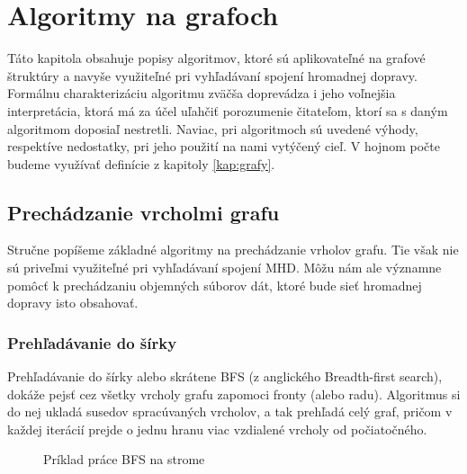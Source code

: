 \chapter{Algoritmy na grafoch}
\label{kap:algoritmy}

Táto kapitola obsahuje popisy algoritmov, ktoré sú aplikovateľné na grafové štruktúry a navyše využiteľné pri vyhľadávaní spojení hromadnej dopravy. Formálnu charakterizáciu algoritmu zväčša doprevádza i jeho voľnejšia interpretácia, ktorá má za účel uľahčiť porozumenie čitateľom, ktorí sa s daným algoritmom doposiaľ nestretli. Naviac, pri algoritmoch sú uvedené výhody, respektíve nedostatky, pri jeho použití na nami vytýčený cieľ. V hojnom počte budeme využívať definície z kapitoly \ref{kap:grafy}.\newline


\section{Prechádzanie vrcholmi grafu}

Stručne popíšeme základné algoritmy na prechádzanie vrholov grafu. Tie však nie sú priveľmi využiteľné pri vyhľadávaní spojení MHD. Môžu nám ale významne pomôcť k prechádzaniu objemných súborov dát, ktoré bude sieť hromadnej dopravy isto obsahovať.\newline


\subsection{Prehľadávanie do šírky}

Prehľadávanie do šírky alebo skrátene BFS (z anglického Breadth-first search), dokáže pejsť cez všetky vrcholy grafu zapomoci fronty (alebo radu). Algoritmus si do nej ukladá susedov spracúvaných vrcholov, a tak prehľadá celý graf, pričom v každej iterácií prejde o jednu hranu viac vzdialené vrcholy od počiatočného.\newline

\begin{figure}[H]
  \caption{Príklad práce BFS na strome}
  \label{BFS_priklad}
\end{figure}


